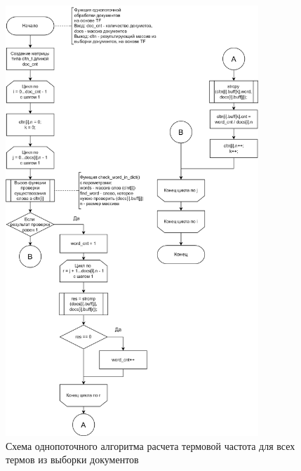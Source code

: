 \begin{figure}[h]
	\centering
	\includegraphics[width=0.85\textwidth]{img/tf_alg.png}
	\caption{Схема однопоточного алгоритма расчета термовой частота для всех термов из выборки документов}
	\label{fig:tf}
\end{figure}

\clearpage

